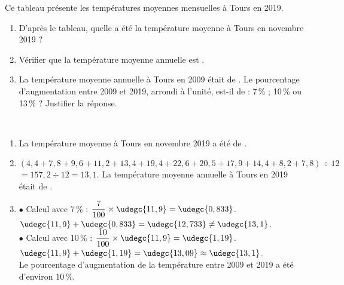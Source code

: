 \begin{exercice*}
   Ce tableau présente les températures moyennes mensuelles à Tours en 2019.
   \begin{center}      

   \end{center}
   \begin{enumerate}
      \item D'après le tableau, quelle a été la température moyenne à Tours en novembre 2019 ?
      \item Vérifier que la température moyenne annuelle est .
      \item La température moyenne annuelle à Tours en 2009 était de . Le pourcentage d'augmentation entre 2009 et 2019, arrondi à l'unité, est-il de :  7\,\% ; 10\,\%  ou 13\,\%  ? Justifier la réponse.
   \end{enumerate}
\end{exercice*}

\begin{corrige}
   \ \\ [-5mm]
      \begin{enumerate}
      \item La température moyenne à Tours en novembre 2019 a été de {\red {}}.
      \item $(4,4+7,8+9,6+11,2+13,4+19,4+22,6+20,5+17,9+ 14,4+8,2+7,8)\div12$ \\
         $=157,2\div12 =13,1$. {\red La température moyenne annuelle à Tours en 2019 était de }. \smallskip
         \item \textcolor{G1}{$\bullet$} Calcul avec 7\,\% : $\dfrac{7}{100}\times\udegc{11,9} =\udegc{0,833}$. \\ [1mm]
            $\udegc{11,9}+\udegc{0,833} =\udegc{12,733} \neq\udegc{13,1}$. \\ [1mm]
            \textcolor{G1}{$\bullet$} Calcul avec  10\,\% : $\dfrac{10}{100}\times\udegc{11,9} =\udegc{1,19}$. \\ [1mm]
            $\udegc{11,9}+\udegc{1,19} =\udegc{13,09} \approx\udegc{13,1}$. \\
           {\red Le pourcentage d'augmentation de la température entre 2009 et 2019 a été d'environ 10\,\%}.
   \end{enumerate}
\end{corrige}

